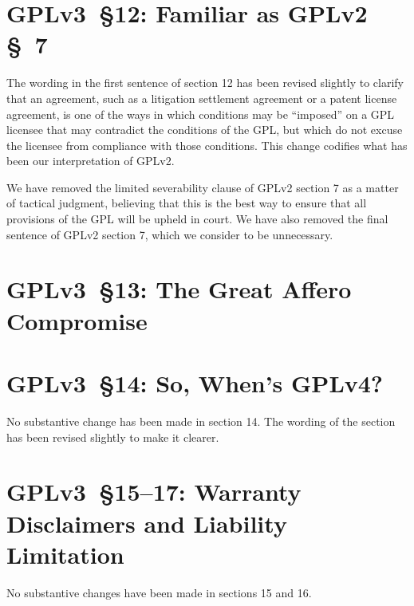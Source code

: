 \section{GPLv3~\S12: Familiar as GPLv2 \S~7}


The wording in the first sentence of section 12 has been revised
slightly to clarify that an agreement, such as a litigation settlement
agreement or a patent license agreement, is one of the ways in which
conditions may be ``imposed'' on a GPL licensee that may contradict the
conditions of the GPL, but which do not excuse the licensee from
compliance with those conditions.  This change codifies what has been
our interpretation of GPLv2.  


We have removed the limited severability clause of GPLv2 section 7 as a
matter of tactical judgment, believing that this is the best way to ensure
that all provisions of the GPL will be upheld in court. We have also removed
the final sentence of GPLv2 section 7, which we consider to be unnecessary.

\section{GPLv3~\S13: The Great Affero Compromise}


\section{GPLv3~\S14: So, When's GPLv4?}
\label{GPlv2s14}


No substantive change has been made in section 14. The wording of the section
has been revised slightly to make it clearer.


\section{GPLv3~\S15--17: Warranty Disclaimers and Liability Limitation}

No substantive changes have been made in sections 15 and 16.



